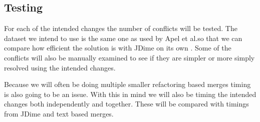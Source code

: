 \documentclass[12pt]{CRPITStyle}
\renewcommand{\cite}{\citep}
\begin{document}
\subsection{Testing}

For each of the intended changes the number of conflicts will be tested. The dataset we intend to use is the same one as used by Apel et al.so that we can compare how efficient the solution is with JDime on its own \cite{Apel2011}. Some of the conflicts will also be manually examined to see if they are simpler or more simply resolved using the intended changes. 

Because we will often be doing multiple smaller refactoring based merges timing is also going to be an issue. With this in mind we will also be timing the intended changes both independently and together. These will be compared with timings from JDime and text based merges.



\end{document}

